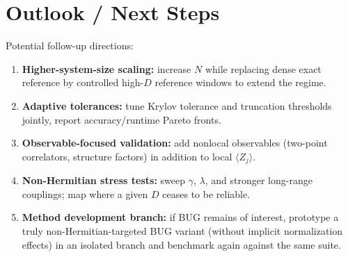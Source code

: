 \documentclass[11pt]{article}
\begin{document}
\section{Outlook / Next Steps}
Potential follow-up directions:
\begin{enumerate}
  \item \textbf{Higher-system-size scaling:} increase \(N\) while replacing dense exact reference by controlled high-\(D\) reference windows to extend the regime.
  \item \textbf{Adaptive tolerances:} tune Krylov tolerance and truncation thresholds jointly, report accuracy/runtime Pareto fronts.
  \item \textbf{Observable-focused validation:} add nonlocal observables (two-point correlators, structure factors) in addition to local \(\langle Z_j\rangle\).
  \item \textbf{Non-Hermitian stress tests:} sweep \(\gamma\), \(\lambda\), and stronger long-range couplings; map where a given \(D\) ceases to be reliable.
  \item \textbf{Method development branch:} if BUG remains of interest, prototype a truly non-Hermitian-targeted BUG variant (without implicit normalization effects) in an isolated branch and benchmark again against the same suite.
\end{enumerate}
\end{document}
